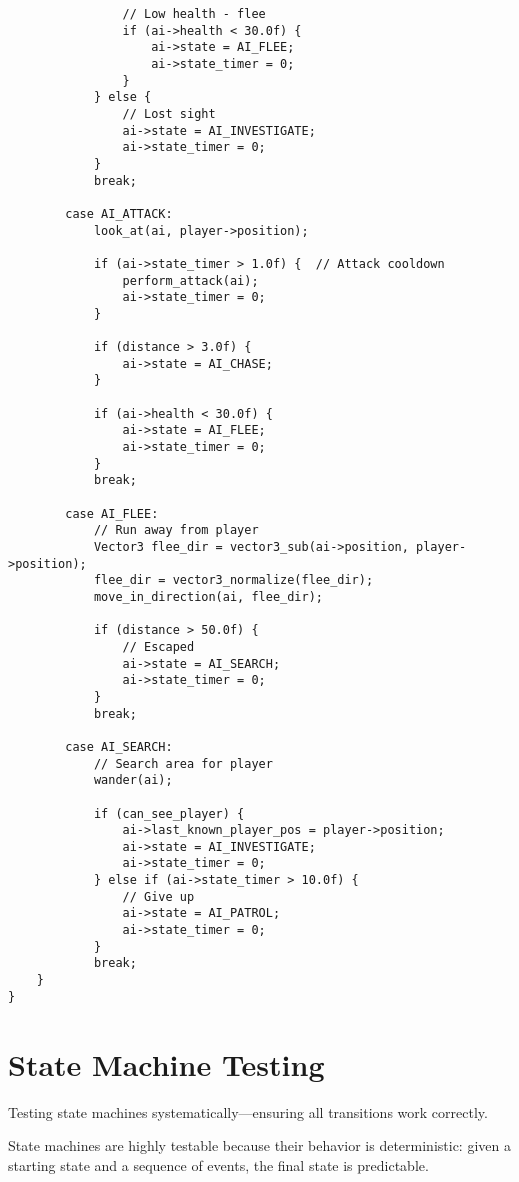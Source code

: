 \begin{lstlisting}
                // Low health - flee
                if (ai->health < 30.0f) {
                    ai->state = AI_FLEE;
                    ai->state_timer = 0;
                }
            } else {
                // Lost sight
                ai->state = AI_INVESTIGATE;
                ai->state_timer = 0;
            }
            break;

        case AI_ATTACK:
            look_at(ai, player->position);

            if (ai->state_timer > 1.0f) {  // Attack cooldown
                perform_attack(ai);
                ai->state_timer = 0;
            }

            if (distance > 3.0f) {
                ai->state = AI_CHASE;
            }

            if (ai->health < 30.0f) {
                ai->state = AI_FLEE;
                ai->state_timer = 0;
            }
            break;

        case AI_FLEE:
            // Run away from player
            Vector3 flee_dir = vector3_sub(ai->position, player->position);
            flee_dir = vector3_normalize(flee_dir);
            move_in_direction(ai, flee_dir);

            if (distance > 50.0f) {
                // Escaped
                ai->state = AI_SEARCH;
                ai->state_timer = 0;
            }
            break;

        case AI_SEARCH:
            // Search area for player
            wander(ai);

            if (can_see_player) {
                ai->last_known_player_pos = player->position;
                ai->state = AI_INVESTIGATE;
                ai->state_timer = 0;
            } else if (ai->state_timer > 10.0f) {
                // Give up
                ai->state = AI_PATROL;
                ai->state_timer = 0;
            }
            break;
    }
}
\end{lstlisting}

\section{State Machine Testing}

Testing state machines systematically---ensuring all transitions work correctly.

State machines are highly testable because their behavior is deterministic: given a starting state and a sequence of events, the final state is predictable.

